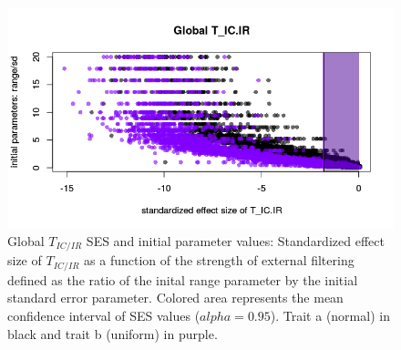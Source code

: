 \documentclass[12pt]{article}\usepackage[]{graphicx}\usepackage[]{color}
\makeatletter
\def\maxwidth{ %
  \ifdim\Gin@nat@width>\linewidth
    \linewidth
  \else
    \Gin@nat@width
  \fi
}
\newenvironment{knitrout}{}{} %
\makeatother
\begin{document}
\begin{knitrout}
\begin{figure}
{\centering \includegraphics[width=\maxwidth]{figure/External_filter_Results_plots_initial_param1-1} 

}

\caption[Global $T_{IC/IR}$ SES and initial parameter values]{Global $T_{IC/IR}$ SES and initial parameter values: Standardized effect size of $T_{IC/IR}$ as a function of the strength of external filtering defined as the ratio of the inital range parameter by the initial standard error parameter. Colored area represents the mean confidence interval of SES values ($alpha = 0.95$). Trait a (normal) in black and trait b (uniform) in purple.}\label{fig:External_filter_Results_plots_initial_param1}
\end{figure}


\end{knitrout}
\end{document}
